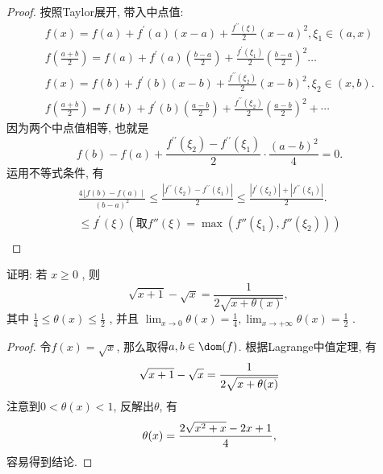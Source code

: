 \begin{proof}
    按照Taylor展开, 带入中点值: 
    $$
    \begin{array}{l}
        f(x)=f(a)+f^{\prime}(a)(x-a)+\frac{f^{\prime \prime}(\xi)}{2}(x-a)^{2}, \xi_{1} \in(a, x) \\
        f\left(\frac{a+b}{2}\right)=f(a)+f^{\prime}(a)\left(\frac{b-a}{2}\right)+\frac{f^{\prime}\left(\xi_{1}\right)}{2}\left(\frac{b-a}{2}\right)^{2} \ldots \\
        f(x)=f(b)+f^{\prime}(b)(x-b)+\frac{f^{\prime \prime}\left(\xi_{2}\right)}{2}(x-b)^{2}, \xi_{2} \in(x, b) . \\
        f\left(\frac{a+b}{2}\right)=f(b)+f^{\prime}(b)\left(\frac{a-b}{2}\right)+\frac{f^{\prime \prime}\left(\xi_{2}\right)}{2}\left(\frac{a-b}{2}\right)^{2} +\cdots
        \end{array}
    $$
    因为两个中点值相等, 也就是
    $$
    f(b)-f(a)+\frac{f^{\prime \prime}\left(\xi_{2}\right)-f^{\prime \prime}\left(\xi_{1}\right)}{2} \cdot \frac{(a-b)^{2}}{4}=0 .
    $$
    运用不等式条件, 有
    $$
    \begin{array}{l}
        \frac{4\lfloor f(b)-f(a) \mid}{(b-a)^{2}} \leqslant \frac{\left|f^{\prime \prime}\left(\xi_{2}\right)-f^{\prime \prime}\left(\xi_{1}\right)\right|}{2} \leqslant \frac{\left|f^{\prime}\left(\xi_{2}\right)\right|+\left|f^{\prime \prime}\left(\xi_{1}\right)\right|}{2} \text {. } \\
        \leqslant f^{\prime}(\xi)(\text{取} f''(\xi)=\max(f''(\xi_1), f''(\xi_2))) \\
    \end{array}
    $$
\end{proof}


\begin{prob} 

    
    证明: 若  $x \geqslant 0$ , 则
$$
\sqrt{x+1}-\sqrt{x}=\frac{1}{2 \sqrt{x+\theta(x)}} \text {, }
$$
其中  $\frac{1}{4} \leqslant \theta(x) \leqslant \frac{1}{2}$ , 并且  $\lim _{x \rightarrow 0} \theta(x)=\frac{1}{4}, \lim _{x \rightarrow+\infty} \theta(x)=\frac{1}{2}$ .
    

\end{prob} 

\begin{proof} 
 
    令$f(x)=\sqrt{x}$, 那么取得$a, b \in \dom(f)$. 根据Lagrange中值定理, 有
    $$
    \sqrt{x+1}-\sqrt{x} = {1\over {2 \sqrt{x+\theta (x)}}}
    $$
    注意到$0 <\theta (x) < 1$, 反解出$\theta$, 有
    $$
    \theta (x) = {2\sqrt{x^2+x} -2x+1 \over 4}, 
    $$
    容易得到结论. 
 
\end{proof} 

